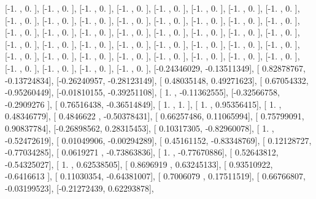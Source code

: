 \documentclass{article}
\begin{document}
       [-1.        ,  0.        ],
       [-1.        ,  0.        ],
       [-1.        ,  0.        ],
       [-1.        ,  0.        ],
       [-1.        ,  0.        ],
       [-1.        ,  0.        ],
       [-1.        ,  0.        ],
       [-1.        ,  0.        ],
       [-1.        ,  0.        ],
       [-1.        ,  0.        ],
       [-1.        ,  0.        ],
       [-1.        ,  0.        ],
       [-1.        ,  0.        ],
       [-1.        ,  0.        ],
       [-1.        ,  0.        ],
       [-1.        ,  0.        ],
       [-1.        ,  0.        ],
       [-1.        ,  0.        ],
       [-1.        ,  0.        ],
       [-1.        ,  0.        ],
       [-1.        ,  0.        ],
       [-1.        ,  0.        ],
       [-1.        ,  0.        ],
       [-1.        ,  0.        ],
       [-1.        ,  0.        ],
       [-1.        ,  0.        ],
       [-1.        ,  0.        ],
       [-1.        ,  0.        ],
       [-1.        ,  0.        ],
       [-1.        ,  0.        ],
       [-1.        ,  0.        ],
       [-1.        ,  0.        ],
       [-1.        ,  0.        ],
       [-1.        ,  0.        ],
       [-1.        ,  0.        ],
       [-1.        ,  0.        ],
       [-1.        ,  0.        ],
       [-1.        ,  0.        ],
       [-1.        ,  0.        ],
       [-1.        ,  0.        ],
       [-1.        ,  0.        ],
       [-1.        ,  0.        ],
       [-1.        ,  0.        ],
       [-1.        ,  0.        ],
       [-0.24346029, -0.13511349],
       [ 0.82878767, -0.13724834],
       [-0.26240957, -0.28123149],
       [ 0.48035148,  0.49271623],
       [ 0.67054332, -0.95260449],
       [-0.01810155, -0.39251108],
       [ 1.        , -0.11362555],
       [-0.32566758, -0.2909276 ],
       [ 0.76516438, -0.36514849],
       [ 1.        ,  1.        ],
       [ 1.        ,  0.95356415],
       [ 1.        ,  0.48346779],
       [ 0.4846622 , -0.50378431],
       [ 0.66257486,  0.11065994],
       [ 0.75799091,  0.90837784],
       [-0.26898562,  0.28315453],
       [ 0.10317305, -0.82960078],
       [ 1.        , -0.52472619],
       [ 0.01049906, -0.00294289],
       [ 0.45161152, -0.83348769],
       [ 0.12128727, -0.77034285],
       [ 0.0619271 , -0.73863836],
       [ 1.        , -0.77670886],
       [ 0.52643812, -0.54325027],
       [ 1.        ,  0.62538505],
       [ 0.8696919 ,  0.63245133],
       [ 0.93510922, -0.6416613 ],
       [ 0.11030354, -0.64381007],
       [ 0.7006079 ,  0.17511519],
       [ 0.66766807, -0.03199523],
       [-0.21272439,  0.62293878],
\end{document}
